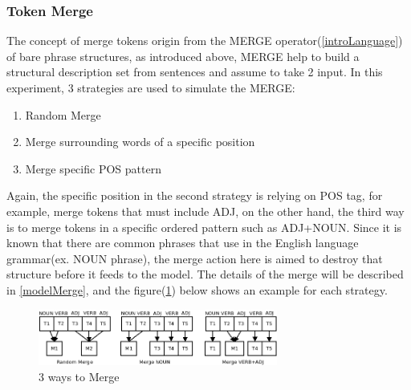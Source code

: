 \documentclass[12pt]{article}
\begin{document}
\subsubsection{Token Merge} \label{incompmerge}
The concept of merge tokens origin from the MERGE operator(\ref{introLanguage}) of bare phrase structures, as introduced above, MERGE help to build a structural description set from sentences and assume to take 2 input. In this experiment, 3 strategies are used to simulate the MERGE:
\begin{center}
\begin{enumerate}
    \item Random Merge
    \item Merge surrounding words of a specific position
    \item Merge specific POS pattern
\end{enumerate}
\end{center}
Again, the specific position in the second strategy is relying on POS tag, for example, merge tokens that must include ADJ, on the other hand, the third way is to merge tokens in a specific ordered pattern such as ADJ+NOUN. Since it is known that there are common phrases that use in the English language grammar(ex. NOUN phrase), the merge action here is aimed to destroy that structure before it feeds to the model. The details of the merge will be described in \ref{modelMerge}, and the figure(\ref{fig:3waysonmerge}) below shows an example for each strategy.

\begin{figure} [!h]
\begin{center}
\includegraphics[width=0.7\textwidth]{figures/merge.png}
\caption{3 ways to Merge}
\label{fig:3waysonmerge}
\end{center}
\end{figure}
\end{document}
